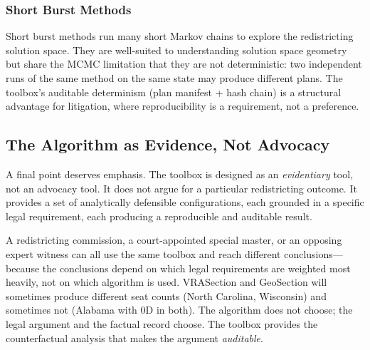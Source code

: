 \subsubsection*{Short Burst Methods}

Short burst methods \citep{cannon2023} run many short Markov chains to
explore the redistricting solution space.
They are well-suited to understanding solution space geometry but share the
MCMC limitation that they are not deterministic: two independent runs of the
same method on the same state may produce different plans.
The toolbox's auditable determinism (plan manifest + hash chain) is a
structural advantage for litigation, where reproducibility is a requirement,
not a preference.

\subsection{The Algorithm as Evidence, Not Advocacy}

A final point deserves emphasis.
The toolbox is designed as an \emph{evidentiary} tool, not an advocacy tool.
It does not argue for a particular redistricting outcome.
It provides a set of analytically defensible configurations, each grounded in
a specific legal requirement, each producing a reproducible and auditable result.

A redistricting commission, a court-appointed special master, or an opposing
expert witness can all use the same toolbox and reach different conclusions---
because the conclusions depend on which legal requirements are weighted most
heavily, not on which algorithm is used.
VRASection and GeoSection will sometimes produce different seat counts (North
Carolina, Wisconsin) and sometimes not (Alabama with $0\mathrm{D}$ in both).
The algorithm does not choose; the legal argument and the factual record choose.
The toolbox provides the counterfactual analysis that makes the argument
\emph{auditable}.
